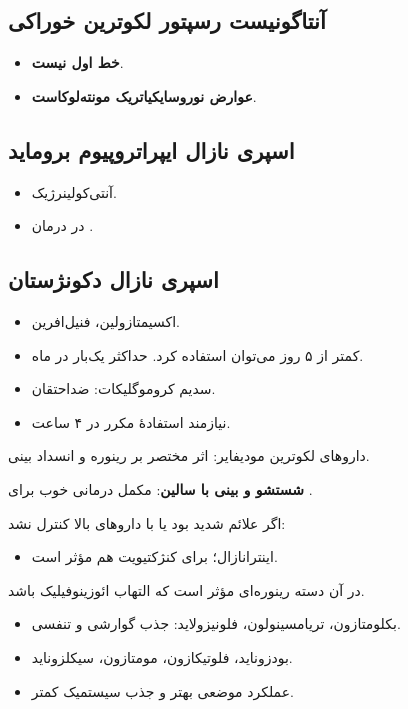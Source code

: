 \documentclass[12pt,a4paper]{article}
\begin{document}
\subsection*{آنتاگونیست رسپتور لکوترین خوراکی}
\begin{itemize}
\item \textbf{خط اول  نیست}.
\item \textbf{عوارض نوروسایکیاتریک مونته‌لوکاست}.
\end{itemize}
\subsection*{اسپری نازال ایپراتروپیوم بروماید}
\begin{itemize}
\item آنتی‌کولینرژیک.
\item در درمان .
\end{itemize}
\subsection*{اسپری نازال دکونژستان}
\begin{itemize}
\item اکسیمتازولین، فنیل‌افرین.
\item کمتر از ۵ روز می‌توان استفاده کرد. حداکثر یک‌بار در ماه.
\end{itemize}

\begin{itemize}
\item سدیم کروموگلیکات: ضداحتقان.
\item نیازمند استفادهٔ مکرر در ۴ ساعت.
\end{itemize}
داروهای لکوترین مودیفایر: اثر مختصر بر رینوره و انسداد بینی.

\textbf{شستشو و  بینی با سالین}: مکمل درمانی خوب برای .

اگر علائم شدید بود یا با داروهای بالا کنترل نشد:
\begin{itemize}
\item {} اینترانازال؛ برای کنژکتیویت هم مؤثر است.
\end{itemize}
 در آن دسته رینوره‌ای مؤثر است که التهاب ائوزینوفیلیک باشد.
\begin{itemize}
\item بکلومتازون، تریامسینولون، فلونیزولاید: جذب گوارشی و تنفسی.
\item بودزوناید، فلوتیکازون، مومتازون، سیکلزوناید.
\item عملکرد موضعی بهتر و جذب سیستمیک کمتر.
\end{itemize}
\end{document}
